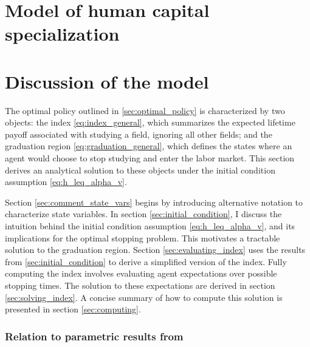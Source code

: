 \documentclass[11 pt]{article}
\newcommand{\toedit}[1]{{\color{gray}#1}}
\newcommand{\toedit}[1]{#1}
\begin{document}


\section{Model of human capital specialization}\label{sec:model}



\section{Discussion of the model}\label{sec:analytic_results}

The optimal policy outlined in \ref{sec:optimal_policy} is characterized by two objects: the index \eqref{eq:index_general}, which summarizes the expected lifetime payoff associated with studying a field, ignoring all other fields; and the graduation region \eqref{eq:graduation_general}, which defines the states where an agent would choose to stop studying and enter the labor market.
\toedit{This section derives an analytical solution to these objects under the initial condition assumption \eqref{eq:h_leq_alpha_v}.}

Section \ref{sec:comment_state_vars} begins by introducing alternative notation to characterize state variables.
In section \ref{sec:initial_condition}, I discuss the intuition behind the initial condition assumption \eqref{eq:h_leq_alpha_v}, and its implications for the optimal stopping problem.
This motivates a tractable solution to the graduation region. 
Section \ref{sec:evaluating_index} uses the results from \ref{sec:initial_condition} to derive a simplified version of the index. 
Fully computing the index involves evaluating agent expectations over possible stopping times. 
The solution to these expectations are derived in section \ref{sec:solving_index}.
A concise summary of how to compute this solution is presented in section \ref{sec:computing}.

\subsubsection*{Relation to parametric results from \textcite{AF20}}
\end{document}
